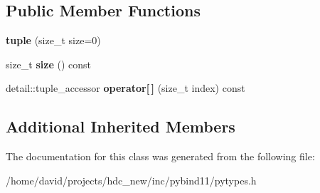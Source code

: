\subsection*{Public Member Functions}
\begin{DoxyCompactItemize}
\item 
{\bfseries tuple} (size\+\_\+t size=0)\hypertarget{classtuple_a627c178ecad64dd6795906d91c844ed8}{}\label{classtuple_a627c178ecad64dd6795906d91c844ed8}

\item 
size\+\_\+t {\bfseries size} () const \hypertarget{classtuple_ab1a5dfee7ebe4c7fc0a3cd1370a7a11b}{}\label{classtuple_ab1a5dfee7ebe4c7fc0a3cd1370a7a11b}

\item 
detail\+::tuple\+\_\+accessor {\bfseries operator\mbox{[}$\,$\mbox{]}} (size\+\_\+t index) const \hypertarget{classtuple_a7dc7d9d9aec976c572a8c608476d6694}{}\label{classtuple_a7dc7d9d9aec976c572a8c608476d6694}

\end{DoxyCompactItemize}
\subsection*{Additional Inherited Members}


The documentation for this class was generated from the following file\+:\begin{DoxyCompactItemize}
\item 
/home/david/projects/hdc\+\_\+new/inc/pybind11/pytypes.\+h\end{DoxyCompactItemize}
